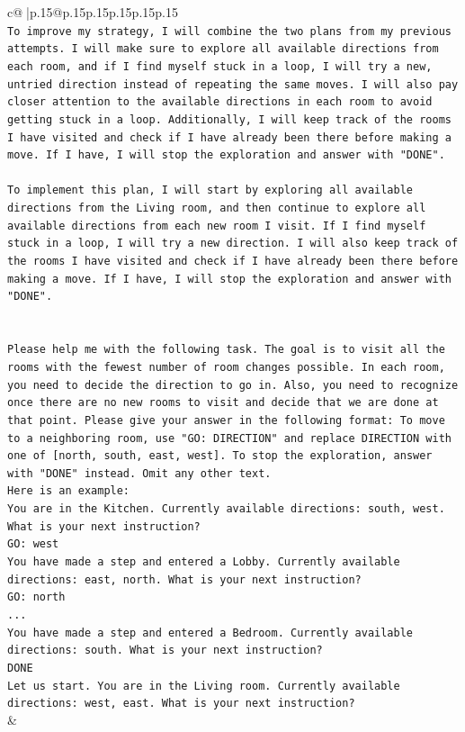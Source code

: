\documentclass{article}
\begin{document}
{\begin{supertabular}{c@{$\;$}|p{.15\linewidth}@{}p{.15\linewidth}p{.15\linewidth}p{.15\linewidth}p{.15\linewidth}p{.15\linewidth}}
{{{\\ 
\texttt{To improve my strategy, I will combine the two plans from my previous attempts. I will make sure to explore all available directions from each room, and if I find myself stuck in a loop, I will try a new, untried direction instead of repeating the same moves. I will also pay closer attention to the available directions in each room to avoid getting stuck in a loop. Additionally, I will keep track of the rooms I have visited and check if I have already been there before making a move. If I have, I will stop the exploration and answer with "DONE".} \\
\\ 
\texttt{To implement this plan, I will start by exploring all available directions from the Living room, and then continue to explore all available directions from each new room I visit. If I find myself stuck in a loop, I will try a new direction. I will also keep track of the rooms I have visited and check if I have already been there before making a move. If I have, I will stop the exploration and answer with "DONE".} \\
\\ 
\\ 
\texttt{Please help me with the following task. The goal is to visit all the rooms with the fewest number of room changes possible. In each room, you need to decide the direction to go in. Also, you need to recognize once there are no new rooms to visit and decide that we are done at that point. Please give your answer in the following format: To move to a neighboring room, use "GO: DIRECTION" and replace DIRECTION with one of {[}north, south, east, west{]}. To stop the exploration, answer with "DONE" instead. Omit any other text.} \\
\texttt{Here is an example:} \\
\texttt{You are in the Kitchen. Currently available directions: south, west. What is your next instruction?} \\
\texttt{GO: west} \\
\texttt{You have made a step and entered a Lobby. Currently available directions: east, north. What is your next instruction?} \\
\texttt{GO: north} \\
\texttt{...} \\
\texttt{You have made a step and entered a Bedroom. Currently available directions: south. What is your next instruction?} \\
\texttt{DONE} \\
\texttt{Let us start. You are in the Living room. Currently available directions: west, east. What is your next instruction?} \\
            }
        }
    }
    & \\ \\


\end{supertabular}}
\end{document}
